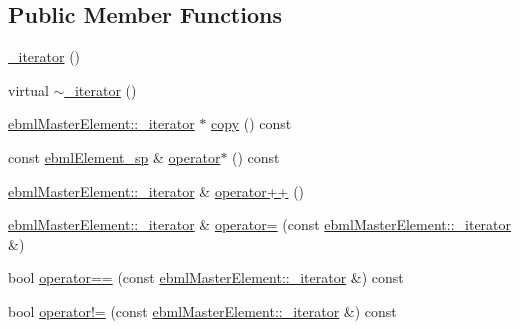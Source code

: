 \subsection*{Public Member Functions}
\begin{DoxyCompactItemize}
\item 
\mbox{\hyperlink{classebml_1_1ebmlMultiSlot_1_1__iterator_a9a5bb54966d95ad5ea80373761494523}{\+\_\+iterator}} ()
\item 
virtual \mbox{\hyperlink{classebml_1_1ebmlMultiSlot_1_1__iterator_a1d4b6ffee0d593ee22ac312d61d99d16}{$\sim$\+\_\+iterator}} ()
\item 
\mbox{\hyperlink{classebml_1_1ebmlMasterElement_1_1__iterator}{ebml\+Master\+Element\+::\+\_\+iterator}} $\ast$ \mbox{\hyperlink{classebml_1_1ebmlMultiSlot_1_1__iterator_a7f26180e096089e0a14986731bc04326}{copy}} () const
\item 
const \mbox{\hyperlink{namespaceebml_adad533b7705a16bb360fe56380c5e7be}{ebml\+Element\+\_\+sp}} \& \mbox{\hyperlink{classebml_1_1ebmlMultiSlot_1_1__iterator_a3baa39c32ce95c538e8fee957d683e50}{operator$\ast$}} () const
\item 
\mbox{\hyperlink{classebml_1_1ebmlMasterElement_1_1__iterator}{ebml\+Master\+Element\+::\+\_\+iterator}} \& \mbox{\hyperlink{classebml_1_1ebmlMultiSlot_1_1__iterator_a59e3bf809115c2ef28cbaf05c0d78afd}{operator++}} ()
\item 
\mbox{\hyperlink{classebml_1_1ebmlMasterElement_1_1__iterator}{ebml\+Master\+Element\+::\+\_\+iterator}} \& \mbox{\hyperlink{classebml_1_1ebmlMultiSlot_1_1__iterator_ae21fb8ce6820c3540dedf14eee28d24a}{operator=}} (const \mbox{\hyperlink{classebml_1_1ebmlMasterElement_1_1__iterator}{ebml\+Master\+Element\+::\+\_\+iterator}} \&)
\item 
bool \mbox{\hyperlink{classebml_1_1ebmlMultiSlot_1_1__iterator_a306e7fd7a564d17febbb08a75dd95b36}{operator==}} (const \mbox{\hyperlink{classebml_1_1ebmlMasterElement_1_1__iterator}{ebml\+Master\+Element\+::\+\_\+iterator}} \&) const
\item 
bool \mbox{\hyperlink{classebml_1_1ebmlMultiSlot_1_1__iterator_a250650c2080db120a29383e5f588feeb}{operator!=}} (const \mbox{\hyperlink{classebml_1_1ebmlMasterElement_1_1__iterator}{ebml\+Master\+Element\+::\+\_\+iterator}} \&) const
\end{DoxyCompactItemize}
